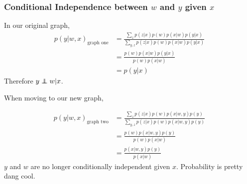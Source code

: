 \documentclass[11pt]{article}
\newcommand\independent{\protect\mathpalette{\protect\independenT}{\perp}}
\def\independenT#1#2{\mathrel{\rlap{$#1#2$}\mkern2mu{#1#2}}}
\begin{document}
\subsubsection{Conditional Independence between \(w\) and \(y\)  given \(x\)}
In our original graph,
\begin{align*}
p(y | w, x)_{\text{graph one}} &= \frac{\sum_{z}p(z | x) p(w) p(x | w) p(y | x)} {\sum_{y,z}p(z | x) p(w) p(x | w) p(y | x)}
\\
&= \frac{ p(w) p(x | w) p(y | x)} { p(w) p(x | w)}
\\
&= p(y | x)
\end{align*}
Therefore \(y \independent w | x\).


When moving to our new graph,

\begin{align*}
p(y | w, x)_{\text{graph two}} &= \frac{\sum_{z}p(z | x) p(w) p(x | w, y) p(y) } {\sum_{y,z}p(z | x) p(w) p(x | w, y) p(y)}
\\
&= \frac{p(w) p(x | w, y) p(y) } { p(w) p(x | w)}
\\
&= \frac{p(x | w, y) p(y) } { p(x | w)}
\end{align*}
\(y\)  and \(w\) are no longer conditionally independent given \(x\).
%
%
\newline
Probability is pretty dang cool.
\end{document}
